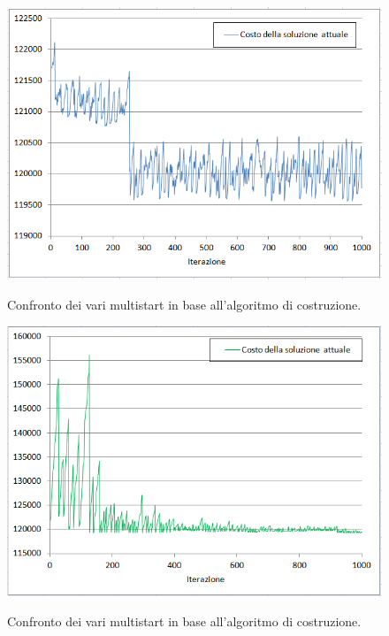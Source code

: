 \begin{figure}[h] 
\begin{center} 
  \includegraphics[scale=0.7]{Images/cost_tabu}\\ 
  \caption{\footnotesize{Confronto dei vari multistart in base all'algoritmo di costruzione.}}
  \label{perf_profile} 
\end{center} 
\end{figure}

\begin{figure}[h] 
\begin{center} 
  \includegraphics[scale=0.7]{Images/cost_sa}\\ 
  \caption{\footnotesize{Confronto dei vari multistart in base all'algoritmo di costruzione.}}
  \label{perf_profile} 
\end{center} 
\end{figure}

